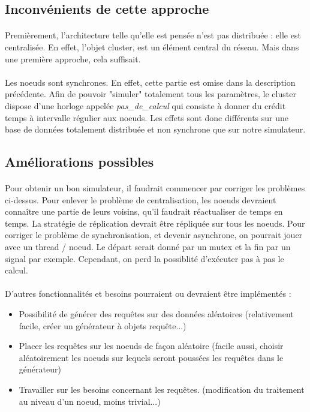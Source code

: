 \documentclass[12pt]{article}
\begin{document}
\subsection{Inconvénients de cette approche}

\paragraph{}Premièrement, l'architecture telle qu'elle est pensée n'est pas distribuée : elle est centralisée. En effet, l'objet cluster, est un élément central du réseau. Mais dans une première approche, cela suffisait.

\paragraph{}Les noeuds sont synchrones. En effet, cette partie est omise dans la description précédente. Afin de pouvoir "simuler" totalement tous les paramètres, le cluster dispose d'une horloge appelée \textit{pas\_de\_calcul} qui consiste à donner du crédit temps à intervalle régulier aux noeuds. Les effets sont donc différents sur une base de données totalement distribuée et non synchrone que sur notre simulateur.

\subsection{Améliorations possibles}

\paragraph{}Pour obtenir un bon simulateur, il faudrait commencer par corriger les problèmes ci-dessus. Pour enlever le problème de centralisation, les noeuds devraient connaître une partie de leurs voisins, qu'il faudrait réactualiser de temps en temps. La stratégie de réplication devrait être répliquée sur tous les noeuds. Pour corriger le problème de synchronisation, et devenir asynchrone, on pourrait jouer avec un thread / noeud. Le départ serait donné par un mutex et la fin par un signal par exemple. Cependant, on perd la possiblité d'exécuter pas à pas le calcul.

\paragraph{}D'autres fonctionnalités et besoins pourraient ou devraient être implémentés : 

\begin{itemize}
    \item Possibilité de générer des requêtes sur des données aléatoires (relativement facile, créer un générateur à objets requête...)
    \item Placer les requêtes sur les noeuds de façon aléatoire (facile aussi, choisir aléatoirement les noeuds sur lequels seront poussées les requêtes dans le générateur)
    \item Travailler sur les besoins concernant les requêtes. (modification du traitement au niveau d'un noeud, moins trivial...)
\end{itemize}
\end{document}
